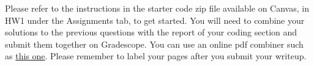 
Please refer to the instructions in the starter code zip file available on Canvas, in HW1 under the Assignments tab, to get started. You will need to combine your solutions to the previous questions with the report of your coding section and submit them together on Gradescope. You can use an online pdf combiner such as \href{https://combinepdf.com/}{this one}. Please remember to label your pages after you submit your writeup.
